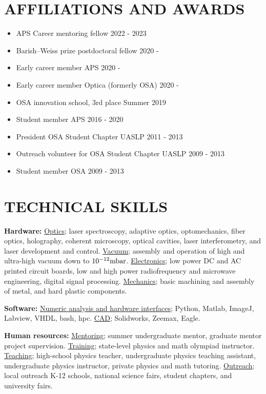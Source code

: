 \documentclass[margin]{res} %
\begin{document}
\begin{resume}
\section{AFFILIATIONS AND AWARDS}
 
\begin{itemize}
    \item{APS Career mentoring fellow \hfill 2022 - 2023}
    \item{Barish--Weiss prize postdoctoral fellow \hfill 2020 -}
    \item{Early career member APS \hfill 2020 -}
    \item{Early career member Optica (formerly OSA) \hfill 2020 -}
    \item{OSA innovation school, 3rd place \hfill Summer 2019}
    \item{Student member APS \hfill 2016 - 2020}
    \item{President OSA Student Chapter UASLP \hfill 2011 - 2013}
    \item{Outreach volunteer for OSA Student Chapter UASLP \hfill 2009 - 2013}
    \item{Student member OSA \hfill 2009 - 2013}
\end{itemize}

\section{TECHNICAL SKILLS}

{\bf Hardware:}
{\underline{Optics};} laser spectroscopy, adaptive optics, optomechanics, fiber optics, holography, coherent microscopy, optical cavities, laser interferometry, and laser development and control. {\underline{Vacuum};} assembly and operation of high and ultra-high vacuum down to ${10^{-12} {\rm mbar}}$. {\underline {Electronics};} low power DC and AC printed circuit boards, low and high power radiofrequency and microwave engineering, digital signal processing. {\underline{Mechanics};} basic machining and assembly of metal, and hard plastic components.

{\bf Software:} 
{\underline{Numeric analysis and hardware interfaces};} Python, Matlab, ImageJ, Labview, VHDL, bash, hpc. {\underline{CAD};} Solidworks, Zeemax, Eagle.

{\bf Human resources:}
{\underline{Mentoring}; summer undergraduate mentor, graduate mentor project supervision. {\underline{Training};} state-level physics and math olympiad instructor. {\underline{Teaching};} high-school physics teacher, undergraduate physics teaching assistant, undergraduate physics instructor, private physics and math tutoring. {\underline{Outreach};} local outreach K-12 schools, national science fairs, student chapters, and university fairs.}

\end{resume}
\end{document}

